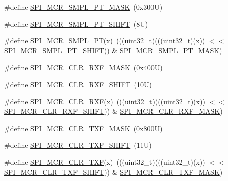 \begin{DoxyCompactItemize}
\item 
\#define \mbox{\hyperlink{group___c_a_n___register___masks_gaebb0539e04af465a39892f5aaabc872d}{S\+P\+I\+\_\+\+M\+C\+R\+\_\+\+S\+M\+P\+L\+\_\+\+P\+T\+\_\+\+M\+A\+SK}}~(0x300\+U)
\item 
\#define \mbox{\hyperlink{group___c_a_n___register___masks_ga1ffc13b9075cc6b0b34ea3162d6c1b74}{S\+P\+I\+\_\+\+M\+C\+R\+\_\+\+S\+M\+P\+L\+\_\+\+P\+T\+\_\+\+S\+H\+I\+FT}}~(8\+U)
\item 
\#define \mbox{\hyperlink{group___c_a_n___register___masks_ga85a76d4d3ea961f858f6eed9882bfd99}{S\+P\+I\+\_\+\+M\+C\+R\+\_\+\+S\+M\+P\+L\+\_\+\+PT}}(x)~(((uint32\+\_\+t)(((uint32\+\_\+t)(x)) $<$$<$ \mbox{\hyperlink{group___c_a_n___register___masks_ga1ffc13b9075cc6b0b34ea3162d6c1b74}{S\+P\+I\+\_\+\+M\+C\+R\+\_\+\+S\+M\+P\+L\+\_\+\+P\+T\+\_\+\+S\+H\+I\+FT}})) \& \mbox{\hyperlink{group___c_a_n___register___masks_gaebb0539e04af465a39892f5aaabc872d}{S\+P\+I\+\_\+\+M\+C\+R\+\_\+\+S\+M\+P\+L\+\_\+\+P\+T\+\_\+\+M\+A\+SK}})
\item 
\#define \mbox{\hyperlink{group___c_a_n___register___masks_gaedd370380f06f2e4bf2ca01babda8732}{S\+P\+I\+\_\+\+M\+C\+R\+\_\+\+C\+L\+R\+\_\+\+R\+X\+F\+\_\+\+M\+A\+SK}}~(0x400\+U)
\item 
\#define \mbox{\hyperlink{group___c_a_n___register___masks_gae1f4b01eb27f199a893e42f6a3d3edb7}{S\+P\+I\+\_\+\+M\+C\+R\+\_\+\+C\+L\+R\+\_\+\+R\+X\+F\+\_\+\+S\+H\+I\+FT}}~(10\+U)
\item 
\#define \mbox{\hyperlink{group___c_a_n___register___masks_gaae3c74d637272a70177d20cfde606d6d}{S\+P\+I\+\_\+\+M\+C\+R\+\_\+\+C\+L\+R\+\_\+\+R\+XF}}(x)~(((uint32\+\_\+t)(((uint32\+\_\+t)(x)) $<$$<$ \mbox{\hyperlink{group___c_a_n___register___masks_gae1f4b01eb27f199a893e42f6a3d3edb7}{S\+P\+I\+\_\+\+M\+C\+R\+\_\+\+C\+L\+R\+\_\+\+R\+X\+F\+\_\+\+S\+H\+I\+FT}})) \& \mbox{\hyperlink{group___c_a_n___register___masks_gaedd370380f06f2e4bf2ca01babda8732}{S\+P\+I\+\_\+\+M\+C\+R\+\_\+\+C\+L\+R\+\_\+\+R\+X\+F\+\_\+\+M\+A\+SK}})
\item 
\#define \mbox{\hyperlink{group___c_a_n___register___masks_ga5b57559246a1a4c32c53542e9f0ea2cb}{S\+P\+I\+\_\+\+M\+C\+R\+\_\+\+C\+L\+R\+\_\+\+T\+X\+F\+\_\+\+M\+A\+SK}}~(0x800\+U)
\item 
\#define \mbox{\hyperlink{group___c_a_n___register___masks_ga0f0a133d00c115835f0b50c334c104cf}{S\+P\+I\+\_\+\+M\+C\+R\+\_\+\+C\+L\+R\+\_\+\+T\+X\+F\+\_\+\+S\+H\+I\+FT}}~(11\+U)
\item 
\#define \mbox{\hyperlink{group___c_a_n___register___masks_ga3556df040389407ff335eb2c0829231a}{S\+P\+I\+\_\+\+M\+C\+R\+\_\+\+C\+L\+R\+\_\+\+T\+XF}}(x)~(((uint32\+\_\+t)(((uint32\+\_\+t)(x)) $<$$<$ \mbox{\hyperlink{group___c_a_n___register___masks_ga0f0a133d00c115835f0b50c334c104cf}{S\+P\+I\+\_\+\+M\+C\+R\+\_\+\+C\+L\+R\+\_\+\+T\+X\+F\+\_\+\+S\+H\+I\+FT}})) \& \mbox{\hyperlink{group___c_a_n___register___masks_ga5b57559246a1a4c32c53542e9f0ea2cb}{S\+P\+I\+\_\+\+M\+C\+R\+\_\+\+C\+L\+R\+\_\+\+T\+X\+F\+\_\+\+M\+A\+SK}})
$$
\end{DoxyCompactItemize}

